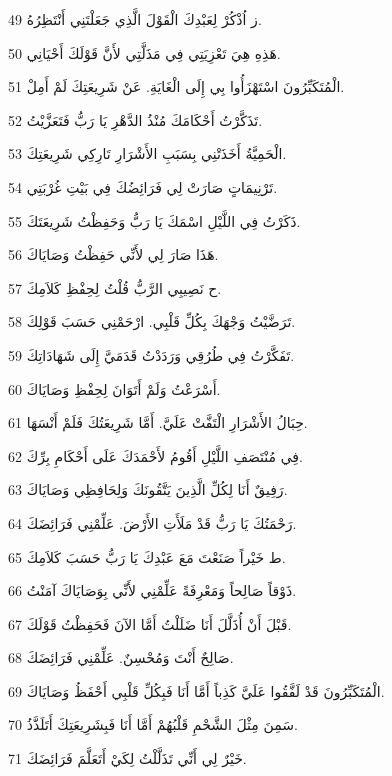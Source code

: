 \par 49 ز اُذْكُرْ لِعَبْدِكَ الْقَوْلَ الَّذِي جَعَلْتَنِي أَنْتَظِرُهُ.
\par 50 هَذِهِ هِيَ تَعْزِيَتِي فِي مَذَلَّتِي لأَنَّ قَوْلَكَ أَحْيَانِي.
\par 51 الْمُتَكَبِّرُونَ اسْتَهْزَأُوا بِي إِلَى الْغَايَةِ. عَنْ شَرِيعَتِكَ لَمْ أَمِلْ.
\par 52 تَذَكَّرْتُ أَحْكَامَكَ مُنْذُ الدَّهْرِ يَا رَبُّ فَتَعَزَّيْتُ.
\par 53 الْحَمِيَّةُ أَخَذَتْنِي بِسَبَبِ الأَشْرَارِ تَارِكِي شَرِيعَتِكَ.
\par 54 تَرْنِيمَاتٍ صَارَتْ لِي فَرَائِضُكَ فِي بَيْتِ غُرْبَتِي.
\par 55 ذَكَرْتُ فِي اللَّيْلِ اسْمَكَ يَا رَبُّ وَحَفِظْتُ شَرِيعَتَكَ.
\par 56 هَذَا صَارَ لِي لأَنِّي حَفِظْتُ وَصَايَاكَ.
\par 57 ح نَصِيبِي الرَّبُّ قُلْتُ لِحِفْظِ كَلاَمِكَ.
\par 58 تَرَضَّيْتُ وَجْهَكَ بِكُلِّ قَلْبِي. ارْحَمْنِي حَسَبَ قَوْلِكَ.
\par 59 تَفَكَّرْتُ فِي طُرُقِي وَرَدَدْتُ قَدَمَيَّ إِلَى شَهَادَاتِكَ.
\par 60 أَسْرَعْتُ وَلَمْ أَتَوَانَ لِحِفْظِ وَصَايَاكَ.
\par 61 حِبَالُ الأَشْرَارِ الْتَفَّتْ عَلَيَّ. أَمَّا شَرِيعَتُكَ فَلَمْ أَنْسَهَا.
\par 62 فِي مُنْتَصَفِ اللَّيْلِ أَقُومُ لأَحْمَدَكَ عَلَى أَحْكَامِ بِرِّكَ.
\par 63 رَفِيقٌ أَنَا لِكُلِّ الَّذِينَ يَتَّقُونَكَ وَلِحَافِظِي وَصَايَاكَ.
\par 64 رَحْمَتُكَ يَا رَبُّ قَدْ مَلَأَتِ الأَرْضَ. عَلِّمْنِي فَرَائِضَكَ.
\par 65 ط خَيْراً صَنَعْتَ مَعَ عَبْدِكَ يَا رَبُّ حَسَبَ كَلاَمِكَ.
\par 66 ذَوْقاً صَالِحاً وَمَعْرِفَةً عَلِّمْنِي لأَنِّي بِوَصَايَاكَ آمَنْتُ.
\par 67 قَبْلَ أَنْ أُذَلَّلَ أَنَا ضَلَلْتُ أَمَّا الآنَ فَحَفِظْتُ قَوْلَكَ.
\par 68 صَالِحٌ أَنْتَ وَمُحْسِنٌ. عَلِّمْنِي فَرَائِضَكَ.
\par 69 الْمُتَكَبِّرُونَ قَدْ لَفَّقُوا عَلَيَّ كَذِباً أَمَّا أَنَا فَبِكُلِّ قَلْبِي أَحْفَظُ وَصَايَاكَ.
\par 70 سَمِنَ مِثْلَ الشَّحْمِ قَلْبُهُمْ أَمَّا أَنَا فَبِشَرِيعَتِكَ أَتَلَذَّذُ.
\par 71 خَيْرٌ لِي أَنِّي تَذَلَّلْتُ لِكَيْ أَتَعَلَّمَ فَرَائِضَكَ.

